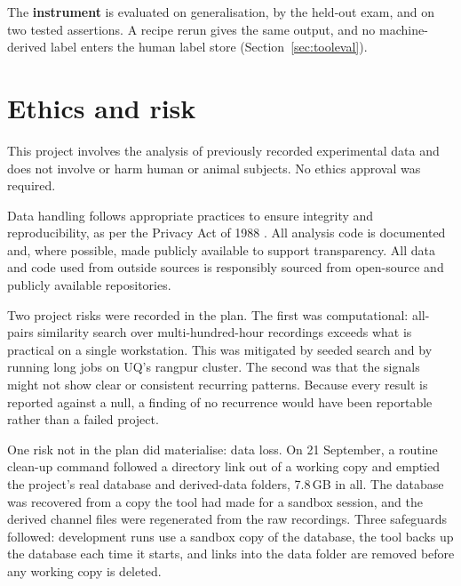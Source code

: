 The \textbf{instrument} is evaluated on generalisation, by the held-out exam, and on two tested assertions. A recipe rerun gives the same output, and no machine-derived label enters the human label store (Section~\ref{sec:tooleval}).

\section{Ethics and risk}
\label{sec:ethics}

This project involves the analysis of previously recorded experimental data and does not involve or harm human or animal subjects. No ethics approval was required.

Data handling follows appropriate practices to ensure integrity and reproducibility, as per the Privacy Act of 1988 \cite{privacyact}. All analysis code is documented and, where possible, made publicly available to support transparency. All data and code used from outside sources is responsibly sourced from open-source and publicly available repositories.

Two project risks were recorded in the plan. The first was computational: all-pairs similarity search over multi-hundred-hour recordings exceeds what is practical on a single workstation. This was mitigated by seeded search and by running long jobs on UQ's rangpur cluster. The second was that the signals might not show clear or consistent recurring patterns. Because every result is reported against a null, a finding of no recurrence would have been reportable rather than a failed project.

One risk not in the plan did materialise: data loss. On 21 September, a routine clean-up command followed a directory link out of a working copy and emptied the project's real database and derived-data folders, 7.8\,GB in all. The database was recovered from a copy the tool had made for a sandbox session, and the derived channel files were regenerated from the raw recordings. Three safeguards followed: development runs use a sandbox copy of the database, the tool backs up the database each time it starts, and links into the data folder are removed before any working copy is deleted.

